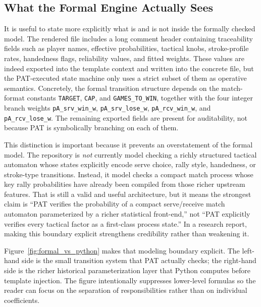 \documentclass{article}
\begin{document}
\subsection*{What the Formal Engine Actually Sees}
It is useful to state more explicitly what is and is not inside the formally checked model. The rendered  file includes a long comment header containing traceability fields such as player names, effective probabilities, tactical knobs, stroke-profile rates, handedness flags, reliability values, and fitted weights. These values are indeed exported into the template context and written into the concrete  file, but the PAT-executed state machine only uses a strict subset of them as operative semantics. Concretely, the formal transition structure depends on the match-format constants \texttt{TARGET}, \texttt{CAP}, and \texttt{GAMES\_TO\_WIN}, together with the four integer branch weights \texttt{pA\_srv\_win\_w}, \texttt{pA\_srv\_lose\_w}, \texttt{pA\_rcv\_win\_w}, and \texttt{pA\_rcv\_lose\_w}. The remaining exported fields are present for auditability, not because PAT is symbolically branching on each of them.

This distinction is important because it prevents an overstatement of the formal model. The repository is \emph{not} currently model checking a richly structured tactical automaton whose states explicitly encode serve choice, rally style, handedness, or stroke-type transitions. Instead, it model checks a compact match process whose key rally probabilities have already been compiled from those richer upstream features. That is still a valid and useful architecture, but it means the strongest claim is ``PAT verifies the probability of a compact serve/receive match automaton parameterized by a richer statistical front-end,'' not ``PAT explicitly verifies every tactical factor as a first-class process state.'' In a research report, making this boundary explicit strengthens credibility rather than weakening it.

Figure~\ref{fig:formal_vs_python} makes that modeling boundary explicit. The left-hand side is the small transition system that PAT actually checks; the right-hand side is the richer historical parameterization layer that Python computes before template injection. The figure intentionally suppresses lower-level formulas so the reader can focus on the separation of responsibilities rather than on individual coefficients.
\end{document}
